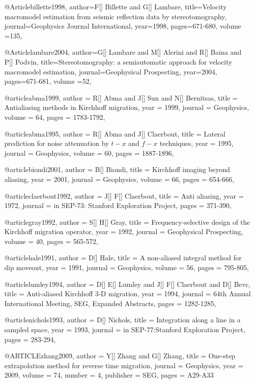 {@Article{billette1998,
author={F[] Billette and G[] Lambare},
title={Velocity macromodel estimation from seismic reflection data by stereotomography},
journal={Geophysics Journal International},
year=1998,
pages={671-680},
volume ={135},
}

@Article{lambare2004,
author={G[] Lambare and M[] Alerini and R[] Baina and P[] Podvin},
title={Stereotomography: a semiautomatic approach for velocity macromodel estimation},
journal={Geophysical Prospecting},
year=2004,
pages={671-681},
volume ={52},
}

@article{abma1999,
  author =	 {R[] Abma and J[] Sun and N[] Bernitsas},
  title =	 {Antialiasing methods in Kirchhoff migration},
  year =	 1999,
  journal =	 {Geophysics},
  volume =	 64,
  pages =	 {1783-1792},
}

@article{abma1995,
  author =	 {R[] Abma and J[] Claerbout},
  title =	 {Lateral prediction for noise attenuation by $t-x$ and $f-x$ techniques},
  year =	 1995,
  journal =	 {Geophysics},
  volume =	 60,
  pages =	 {1887-1896},
}

@article{biondi2001,
  author =	 {B[] Biondi},
  title =	 {Kirchhoff imaging beyond aliasing},
  year =	 2001,
  journal =	 {Geophysics},
  volume =	 66,
  pages =	 {654-666},
}

@article{claerbout1992,
  author =	 {J[] F[] Claerbout},
  title =	 {Anti aliasing},
  year =	 1972,
  journal =	 {in SEP-73: Stanford Exploration Project},
  pages =	 {371-390},
}

@article{gray1992,
  author =	 {S[] H[] Gray},
  title =	 {Frequency-selective design of the Kirchhoff migration operator},
  year =	 1992,
  journal =	 {Geophysical Prospecting},
  volume =	 40,
  pages =	 {565-572},
}

@article{hale1991,
  author =	 {D[] Hale},
  title =	 {A non-aliased integral method for dip moveout},
  year =	 1991,
  journal =	 {Geophysics},
  volume =	 56,
  pages =	 {795-805},
}

@article{lumley1994,
  author =	 {D[] E[] Lumley and J[] F[] Claerbout and D[] Bevc},
  title =	 {Anti-aliased Kirchhoff 3-D migration},
  year =	 1994,
  journal =	 {64th Annual International Meeting, SEG, Expanded Abstracts},
  pages =	 {1282-1285},
}

@article{nichols1993,
  author =	 {D[] Nichols},
  title =	 {Integration along a line in a sampled space},
  year =	 1993,
  journal =	 {in SEP-77:Stanford Exploration Project},
  pages =	 {283-294},
}

@ARTICLE{zhang2009,
  author = {Y[] Zhang and G[] Zhang},
  title = {One-step extrapolation method for reverse time migration},
  journal = {Geophysics},
  year = {2009},
  volume = {74},
  number = {4},
  publisher = {SEG},
  pages = {A29-A33}
}

}
